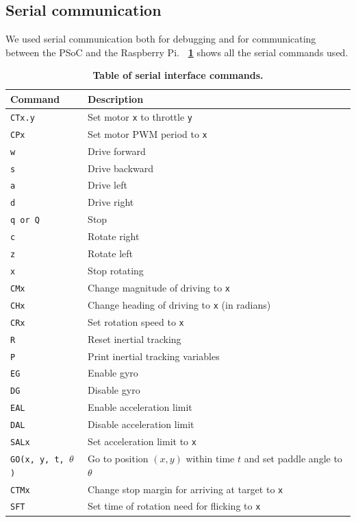 \documentclass[letterpaper, 11pt]{article}
\newcommand*{\tblref}[1]{\textbf{\tablename~\ref{#1}}}
\begin{document}
\subsection{Serial communication}
We used serial communication both for debugging and for communicating between the PSoC and the Raspberry Pi. \tblref{tbl:commands} shows all the serial commands used.
\begin{table}[ht]
    \centering
    \begin{tabular}{@{}ll@{}}
        \toprule
        \textbf{Command} & \textbf{Description} \\ \midrule
        \texttt{CTx.y} & Set motor \texttt{x} to throttle \texttt{y} \\
        \texttt{CPx} & Set motor PWM period to \texttt{x} \\ \midrule
        \texttt{w} & Drive forward \\
        \texttt{s} & Drive backward \\
        \texttt{a} & Drive left \\
        \texttt{d} & Drive right \\
        \texttt{q or Q} & Stop \\
        \texttt{c} & Rotate right \\
        \texttt{z} & Rotate left \\
        \texttt{x} & Stop rotating \\
        \texttt{CMx} & Change magnitude of driving to \texttt{x} \\
        \texttt{CHx} & Change heading of driving to \texttt{x} (in radians) \\
        \texttt{CRx} & Set rotation speed to \texttt{x} \\ \midrule
        \texttt{R} & Reset inertial tracking \\
        \texttt{P} & Print inertial tracking variables \\
        \texttt{EG} & Enable gyro \\
        \texttt{DG} & Disable gyro \\
        \texttt{EAL} & Enable acceleration limit \\ \midrule
        \texttt{DAL} & Disable acceleration limit \\
        \texttt{SALx} & Set acceleration limit to \texttt{x} \\
        \texttt{GO(x, y, t, $\theta$)} & Go to position $(x, y)$ within time $t$ and set paddle angle to $\theta$ \\
        \texttt{CTMx} & Change stop margin for arriving at target to \texttt{x} \\
        \texttt{SFT} & Set time of rotation need for flicking to \texttt{x} \\ \bottomrule
    \end{tabular}
    \caption{\textbf{Table of serial interface commands.}}
    \label{tbl:commands}
\end{table}
\end{document}

